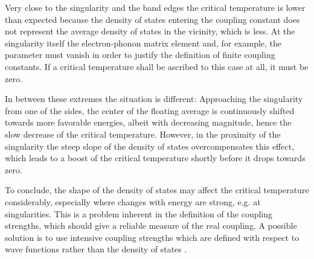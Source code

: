 Very close to the  singularity and the band edges the critical
temperature is lower than expected because the density of states entering the
coupling constant does not represent the average density of states in the
vicinity, which is less. At the singularity itself the electron-phonon matrix
element and, for example, the  parameter must vanish in order to
justify the definition of finite coupling constants. If a critical temperature
shall be ascribed to this case at all, it must be zero.

In between these extremes the situation is different: Approaching the  singularity from one of the sides, the center of the floating average is
continuously shifted towards more favorable energies, albeit with decreasing
magnitude, hence the slow decrease of the critical temperature. However, in the
proximity of the  singularity the steep slope of the density of
states overcompensates this effect, which leads to a boost of the critical
temperature shortly before it drops towards zero.

To conclude, the shape of the density of states may affect the critical
temperature considerably, especially where changes with energy are strong, e.g.
at  singularities. This is a problem inherent in the definition
of the coupling strengths, which should give a reliable measure of the real
coupling. A possible solution is to use intensive coupling strengths which are
defined with respect to wave functions rather than the density of states
\cite{PickettKlein81}.
